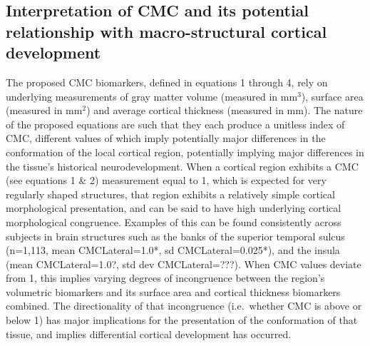 \documentclass{article}
\begin{document}
\subsection{Interpretation of CMC and its potential relationship with macro-structural cortical development}

The proposed CMC biomarkers, defined in equations 1 through 4, rely on
underlying measurements of gray matter volume (measured in mm\(^3\)), surface area
(measured in mm\(^2\)) and average cortical thickness (measured in mm). The nature
of the proposed equations are such that they each produce a unitless index of
CMC, different values of which imply potentially major differences in the
conformation of the local cortical region, potentially implying major
differences in the tissue's historical neurodevelopment. When a cortical
region exhibits a CMC (see equations 1 \& 2) measurement equal to 1, which is
expected for very regularly shaped structures, that region exhibits a
relatively simple cortical morphological presentation, and can be said to
have high underlying cortical morphological congruence. Examples of this can
be found consistently across subjects in brain structures such as the banks
of the superior temporal sulcus (n=1,113, mean CMCLateral=1.0*, sd
CMCLateral=0.025*), and the insula (mean CMCLateral=1.0?, std dev
CMCLateral=???). When CMC values deviate from 1, this implies varying degrees
of incongruence between the region's volumetric biomarkers and its surface
area and cortical thickness biomarkers combined. The directionality of that
incongruence (i.e.\ whether CMC is above or below 1) has major implications
for the presentation of the conformation of that tissue, and implies
differential cortical development has occurred.
\end{document}
